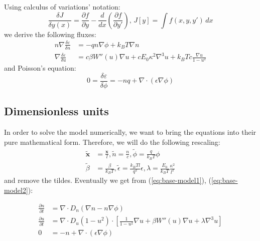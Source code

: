 \documentclass[12pt]{article}
\begin{document}
Using calculus of variations' notation:
\begin{equation}
   \frac{\delta J}{\delta y(x)} = \frac{\partial f}{\partial y} - \frac{d}{dx} \left(\frac{\partial f}{\partial y'}\right), \, J[y] = \int f(x, y, y') \, dx
\end{equation}
we derive the following fluxes:
\begin{equation} \label{eq:base-model1}
    \begin{aligned}
        n\nabla \frac{\delta \varepsilon}{\delta n} &= - qn\nabla \phi + k_B T\nabla n \\
        \nabla \frac{\delta \varepsilon}{\delta u} &= c\beta W''(u) \nabla u + cE_0 \kappa^2 \nabla^3 u + k_B T c \frac{\nabla u}{1-u^2}
    \end{aligned}
\end{equation}
and Poisson's equation:
\begin{equation} \label{eq:base-model2}
    0 = \frac{\delta \varepsilon}{\delta \phi} = -nq + \nabla \cdot (\epsilon \nabla \phi)
\end{equation}

\subsection{Dimensionless units}

In order to solve the model numerically, we want to bring the equations into their pure mathematical form. Therefore, we will do the following rescaling:
\begin{equation}
    \begin{aligned}
        \mathbf{\tilde{x}} &= \frac{\mathbf{x}}{l},  \tilde{n} = \frac{n}{c}, \tilde{\phi} = \frac{q}{k_BT}\phi \\
        \tilde{\beta} &= \frac{\beta}{k_BT}, \tilde{\epsilon} = \frac{k_BTl}{q^2}\epsilon, \lambda = \frac{E_0}{k_BT} \frac{\kappa^2}{l^2}
    \end{aligned}
\end{equation}
and remove the tildes. Eventually we get from (\ref{eq:base-model1}), (\ref{eq:base-model2}):

\begin{subequations}\label{eq:dimensionless-model}
    \begin{align}
        \frac{\partial n}{\partial t} &= \nabla \cdot D_n( \nabla n - n\nabla \phi) \\
        \frac{\partial u}{\partial t} &= \nabla \cdot D_u (1-u^2) \cdot \left[\frac{1}{1-u^2}\nabla u + \beta W''(u)\nabla u +\lambda \nabla ^3 u\right] \\
    0 &= -n + \nabla \cdot (\epsilon \nabla \phi)
    \end{align}
\end{subequations}
\end{document}
